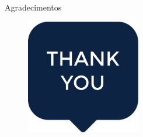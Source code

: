 \documentclass[aspectratio=169]{beamer}
\begin{document}
\begin{frame}{Agradecimentos}
    \begin{figure}[h]
        \centering
        \includegraphics[width=5cm]{thank-you.eps}
    \end{figure}
\end{frame}


\end{document}
